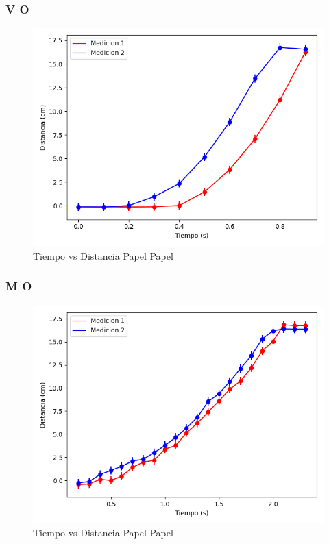 \documentclass[12pt,a4]{article}
\begin{document}
\subsubsection{V O}

\begin{figure}[H]
    \centering
    \includegraphics[width=0.9\linewidth]{TiempoVsDistanciaPapelPapelV_O.png}
    \caption{Tiempo vs Distancia Papel Papel}
    \label{fig:TvDV_O papel papel}
\end{figure}

\subsubsection{M O}

\begin{figure}[H]
    \centering
    \includegraphics[width=0.9\linewidth]{TiempoVsDistanciaPapelPapelM_O.png}
    \caption{Tiempo vs Distancia Papel Papel}
    \label{fig:TvDM_O papel papel}
\end{figure}
\end{document}
